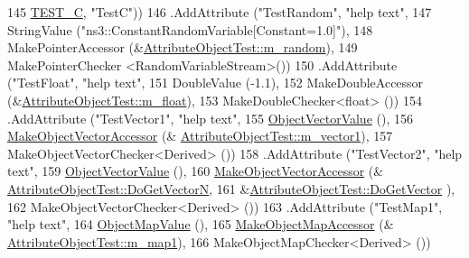 \begin{DoxyCode}
145                                       \hyperlink{classAttributeObjectTest_a7d0dfe3f27ac6d9338a92781caf287cba34f22f94dd4e890a10784749d81ea296}{TEST\_C}, \textcolor{stringliteral}{"TestC"}))
146       .AddAttribute (\textcolor{stringliteral}{"TestRandom"}, \textcolor{stringliteral}{"help text"},
147                      StringValue (\textcolor{stringliteral}{"ns3::ConstantRandomVariable[Constant=1.0]"}),
148                      MakePointerAccessor (&\hyperlink{classAttributeObjectTest_a2cd598372304f8001e148640239cbe6d}{AttributeObjectTest::m\_random}),
149                      MakePointerChecker <RandomVariableStream>())
150       .AddAttribute (\textcolor{stringliteral}{"TestFloat"}, \textcolor{stringliteral}{"help text"},
151                      DoubleValue (-1.1),
152                      MakeDoubleAccessor (&\hyperlink{classAttributeObjectTest_ae0995453d0082af8f7658361fa3f094a}{AttributeObjectTest::m\_float}),
153                      MakeDoubleChecker<float> ())
154       .AddAttribute (\textcolor{stringliteral}{"TestVector1"}, \textcolor{stringliteral}{"help text"},
155                      \hyperlink{classns3_1_1ObjectPtrContainerValue}{ObjectVectorValue} (),
156                      \hyperlink{namespacens3_a6ad5b3621a5dc72b7030cbb07c73adf6}{MakeObjectVectorAccessor} (&
      \hyperlink{classAttributeObjectTest_a5102acf958f53a14bdddbeac1eaf7db2}{AttributeObjectTest::m\_vector1}),
157                      MakeObjectVectorChecker<Derived> ())
158       .AddAttribute (\textcolor{stringliteral}{"TestVector2"}, \textcolor{stringliteral}{"help text"},
159                      \hyperlink{classns3_1_1ObjectPtrContainerValue}{ObjectVectorValue} (),
160                      \hyperlink{namespacens3_a6ad5b3621a5dc72b7030cbb07c73adf6}{MakeObjectVectorAccessor} (&
      \hyperlink{classAttributeObjectTest_a1a62c49a2dc2a834e950ac7cb290664f}{AttributeObjectTest::DoGetVectorN},
161                                                &\hyperlink{classAttributeObjectTest_a7d814f72561fbeb1a314c06cc6020a19}{AttributeObjectTest::DoGetVector}
      ),
162                      MakeObjectVectorChecker<Derived> ())
163       .AddAttribute (\textcolor{stringliteral}{"TestMap1"}, \textcolor{stringliteral}{"help text"},
164                      \hyperlink{classns3_1_1ObjectPtrContainerValue}{ObjectMapValue} (),
165                      \hyperlink{namespacens3_acfdf708e388c66beea68eb5ecdcb7456}{MakeObjectMapAccessor} (&
      \hyperlink{classAttributeObjectTest_a21c039a81755803a31e1a487961a993d}{AttributeObjectTest::m\_map1}),
166                      MakeObjectMapChecker<Derived> ())

\end{DoxyCode}
